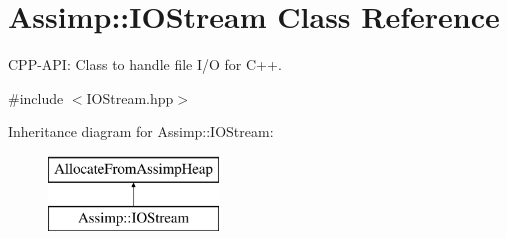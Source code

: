 \hypertarget{class_assimp_1_1_i_o_stream}{}\section{Assimp\+:\+:I\+O\+Stream Class Reference}
\label{class_assimp_1_1_i_o_stream}


C\+P\+P-\/\+A\+PI\+: Class to handle file I/O for C++.  




{\ttfamily \#include $<$I\+O\+Stream.\+hpp$>$}

Inheritance diagram for Assimp\+:\+:I\+O\+Stream\+:\begin{figure}[H]
\begin{center}
\leavevmode
\includegraphics[height=2.000000cm]{class_assimp_1_1_i_o_stream}
\end{center}
\end{figure}

